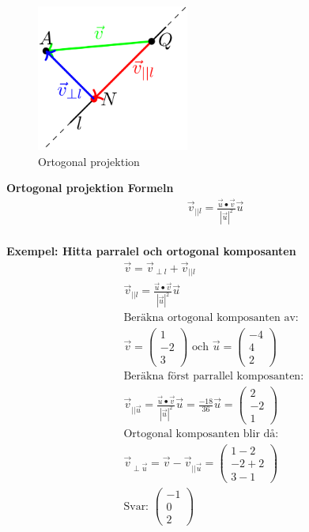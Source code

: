 \begin{multicols}{2}
\begin{figure}[H]
    \centering
    \includegraphics[width=5cm]{image/Ortogonal-projektion.png} 
    \caption{Ortogonal projektion}
\end{figure}

\textbf{Ortogonal projektion Formeln}
\begin{align*} 
  &\quad  \vec{v}_{||{l}} = \frac{\vec{u}\bullet{\vec{v}}}{|\vec{u}|^2}\vec{u}  \\
\end{align*}

\textbf{Exempel: Hitta parralel och ortogonal komposanten}
\begin{align*} 
  &\quad  \vec{v} = \vec{v}_{\perp{l}} + \vec{v}_{||{l}} \\
  &\quad  \vec{v}_{||{l}} = \frac{\vec{u}\bullet{\vec{v}}}{|\vec{u}|^2}\vec{u}  \\
  &\quad  \text{Beräkna ortogonal komposanten av: } \\
  &\quad
  \vec{v} = \begin{pmatrix} 1 \\ -2 \\ 3 \end{pmatrix} \text{ och }
  \vec{u} = \begin{pmatrix} -4 \\ 4 \\ 2 \end{pmatrix} \\
  &\quad  \text{Beräkna först parrallel komposanten: } \\
  &\quad  \vec{v}_{||{\vec{u}}} = \frac{\vec{u}\bullet{\vec{v}}}{|\vec{u}|^2}\vec{u} = \frac{-18}{36}\vec{u}
  = \begin{pmatrix} 2 \\ -2 \\ 1 \end{pmatrix} \\
  &\quad  \text{Ortogonal komposanten blir då: } \\
  &\quad  \vec{v}_{\perp{\vec{u}}} = \vec{v} - \vec{v}_{||{\vec{u}}}
  = \begin{pmatrix} 1-2 \\ -2+2 \\ 3-1 \end{pmatrix} \\
  &\quad  \text{Svar: } \begin{pmatrix} -1 \\ 0 \\ 2 \end{pmatrix}
\end{align*}


\end{multicols}
